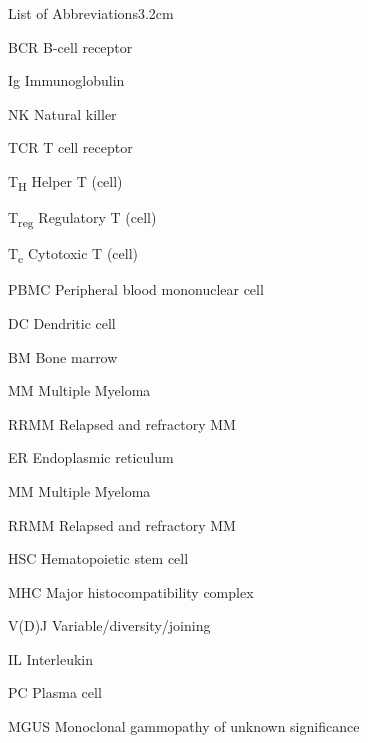 \begin{mclistof}{List of Abbreviations}{3.2cm}

\item[BCR] B-cell receptor

\item[Ig] Immunoglobulin

\item[NK] Natural killer

\item[TCR] T cell receptor

\item[T\textsubscript{H}] Helper T (cell)

\item[T\textsubscript{reg}] Regulatory T (cell)

\item[T\textsubscript{c}] Cytotoxic T (cell)

\item[PBMC] Peripheral blood mononuclear cell

\item[DC] Dendritic cell

\item[BM] Bone marrow

\item[MM] Multiple Myeloma

\item[RRMM] Relapsed and refractory MM

\item[ER] Endoplasmic reticulum

\item[MM] Multiple Myeloma

\item[RRMM] Relapsed and refractory MM

\item[HSC] Hematopoietic stem cell

\item[MHC] Major histocompatibility complex

\item[V(D)J] Variable/diversity/joining

\item[IL] Interleukin

\item[PC] Plasma cell

\item[MGUS] Monoclonal gammopathy of unknown significance


\end{mclistof}
